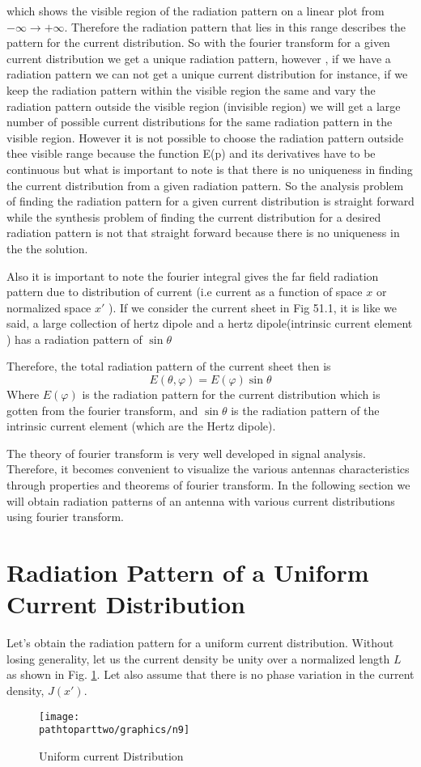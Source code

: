 which shows the visible region of the radiation pattern on a linear plot from $-\infty\to +\infty$. Therefore the radiation pattern that lies in this range describes the pattern for the current distribution. So with the fourier transform for a given current distribution we get a unique radiation pattern, however , if we have a radiation pattern we can not get a unique current distribution for instance, if we keep the radiation pattern within the visible region the same and vary the radiation pattern outside the visible region (invisible region) we will get a large number of possible current distributions for the same radiation pattern in the visible region. However it is not possible to choose the radiation pattern outside thee visible range because the function E(p) and its derivatives have to be continuous but what is important to note is that there is no uniqueness in finding the current distribution from a given radiation pattern. So the analysis problem of finding the radiation pattern for a given current distribution is straight forward while the synthesis problem of finding the current distribution for  a desired radiation pattern is not that straight forward because there is no uniqueness in the the solution.

Also it is important to note the fourier integral gives the far field radiation pattern due to distribution of current (i.e current as a function of space $x$ or normalized space $x'$ ). If we consider the current sheet in Fig 51.1, it is like we said, a large collection of hertz dipole and a hertz dipole(intrinsic current element ) has a radiation pattern of $\sin\theta$

Therefore, the total radiation pattern of the current sheet then
is $$E(\theta, \varphi) = E(\varphi)\sin\theta$$
Where $E(\varphi)$ is the radiation pattern for the current distribution which is gotten from the fourier transform, and $\sin\theta$ is the radiation pattern of the intrinsic current element (which are the Hertz dipole).

The theory of fourier transform is very well developed in signal analysis. Therefore, it becomes convenient to visualize the various antennas characteristics through properties and theorems of fourier transform. In the following section we will obtain radiation patterns of an antenna with various current distributions using fourier transform.

\section{Radiation Pattern of a Uniform Current Distribution}
Let's obtain the radiation pattern for a uniform current distribution. Without losing generality, let us the current density be unity over a normalized length $L$ as shown in Fig. \ref{fig9}. Let also assume that there is no phase variation in the current density, $J(x')$.
\begin{figure}[h]
\centering
\texttt{[image: \\pathtoparttwo/graphics/n9]}
\caption{Uniform current Distribution}
\label{fig9}
\end{figure}


